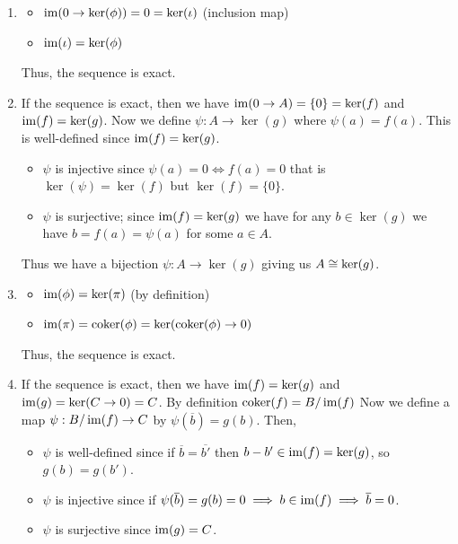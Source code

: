\documentclass[Notebook.tex]{subfiles}
\begin{document}
\begin{solution}
    \bbni
    \begin{enumerate}
        \item \begin{itemize}
            \item $\operatorname{im}(0 \to \ker(\phi)) = 0 = \ker(\iota)$ (inclusion map)
            \item $\operatorname{im}(\iota) = \ker(\phi)$
        \end{itemize}
        Thus, the sequence is exact. 

        \item If the sequence is exact, then we have $\operatorname{im}(0 \to A) = \{0\} = \ker(f)$ and $\operatorname{im}(f) = \ker(g)$. Now we define $\psi: A \to \ker(g)$ where $\psi(a) = f(a)$. This is well-defined since $\operatorname{im}(f) = \ker(g)$. 
        \begin{itemize}
            \item $\psi$ is injective since $\psi(a) = 0 \iff f(a) = 0$ that is $\ker(\psi) = \ker(f)$ but $\ker(f) = \{0\}$. 
            \item $\psi$ is surjective; since $\operatorname{im}(f) = \ker(g)$ we have for any $b \in \ker(g)$ we have $b = f(a) = \psi(a)$ for some $a \in A$. 
        \end{itemize}
        
        Thus we have a bijection $\psi: A \to \ker(g)$ giving us $A \cong \ker(g)$. 
        
        \item  \begin{itemize}
            \item $\operatorname{im}(\phi) = \ker(\pi)$ (by definition)
            \item $\operatorname{im}(\pi) = \operatorname{coker}(\phi) = \ker(\operatorname{coker}(\phi) \to 0)$
        \end{itemize}
        Thus, the sequence is exact. 
        
        \item If the sequence is exact, then we have $\operatorname{im}(f) = \ker(g)$ and $\operatorname{im}(g) = \ker(C \to 0) = C$. By definition $\operatorname{coker}(f) = B/\operatorname{im}(f)$ Now we define a map $\psi:  B/\operatorname{im}(f) \to C$ by $\psi(\overline{b}) = g(b)$. Then, 
        \begin{itemize}
            \item $\psi$ is well-defined since if $\overline{b} = \overline{b'}$ then $b-b' \in \operatorname{im}(f) = \ker(g)$, so $g(b) = g(b')$. 
            \item $\psi$ is injective since if $\psi(\overline{b}) = g(b) = 0 \implies b \in \operatorname{im}(f) \implies \overline{b} = 0$. 
            \item $\psi$ is surjective since $\operatorname{im}(g) = C$. 
        \end{itemize}
        

\end{enumerate}
\end{solution}
\end{document}
